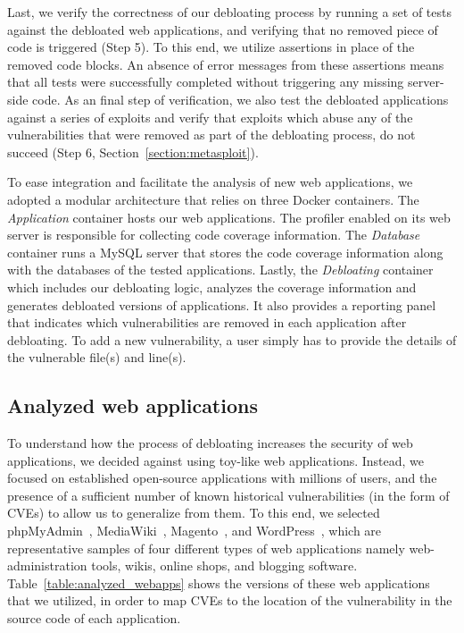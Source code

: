 Last, we verify the correctness of our debloating process by running
a set of tests against the debloated web applications, and verifying that
no removed piece of code is triggered (Step 5). To this end, we
utilize assertions in place of the removed code blocks. An absence of error
messages from these assertions means that all tests were successfully
completed without triggering any missing server-side code. As an final step of
verification, we also test the debloated applications against a series of
exploits and verify that exploits which
abuse any of the vulnerabilities that were removed as part of the debloating
process, do not succeed (Step 6, Section~\ref{section:metasploit}).

To ease integration and facilitate the analysis of new web applications, we
adopted a modular architecture that relies on three Docker containers. The
\textit{Application} container hosts our web applications.  The profiler
enabled on its web server is responsible for collecting code coverage
information. The \textit{Database} container runs a MySQL server that
stores the code coverage information along with the databases of the tested
applications. Lastly, the \textit{Debloating} container which includes our
debloating logic, analyzes the coverage information and generates debloated
versions of applications. It also provides a reporting panel that indicates
which vulnerabilities are removed in each application after debloating. To add
a new vulnerability, a user simply has to provide the details of the vulnerable
file(s) and line(s).


\subsection{Analyzed web applications}
\label{subsec:webapps}

To understand how the process of debloating increases the security of web
applications, we decided against using toy-like web applications. Instead,
we focused on established open-source applications with millions of users,
and the presence of a sufficient number of known historical vulnerabilities
(in the form of CVEs) to allow us to generalize from them. To this end, we
selected {phpMyAdmin}~\cite{phpmyadmin},
{MediaWiki}~\cite{mediawiki}, {Magento}~\cite{magento}, and WordPress~\cite{wordpress},
which are representative samples of four different types of
web applications namely web-administration tools, wikis, online
shops, and blogging software. Table~\ref{table:analyzed_webapps} shows the versions of these web
applications that we utilized, in order to map CVEs to the location of the
vulnerability in the source code of each application.


